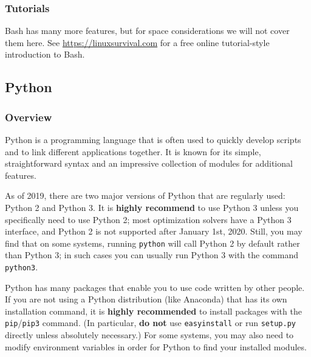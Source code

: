 \documentclass[12pt]{article}
\begin{document}
\subsubsection{Tutorials}
Bash has many more features, but for space considerations we will not cover them here. See \url{https://linuxsurvival.com} for a free online tutorial-style introduction to Bash.

\subsection{Python}
\subsubsection{Overview}
Python is a programming language that is often used to quickly develop scripts and to link different applications together. It is known for its simple, straightforward syntax and an impressive collection of modules for additional features.

As of 2019, there are two major versions of Python that are regularly used: Python 2 and Python 3. It is \textbf{highly recommend} to use Python 3 unless you specifically need to use Python 2; most optimization solvers have a Python 3 interface, and Python 2 is not supported after January 1st, 2020. Still, you may find that on some systems, running \texttt{python} will call Python 2 by default rather than Python 3; in such cases you can usually run Python 3 with the command \texttt{python3}.

Python has many packages that enable you to use code written by other people. If you are not using a Python distribution (like Anaconda) that has its own installation command, it is \textbf{highly recommended} to install packages with the \texttt{pip}/\texttt{pip3} command. (In particular, \textbf{do not} use \texttt{easy\ttul install} or run \texttt{setup.py} directly unless absolutely necessary.) For some systems, you may also need to modify environment variables in order for Python to find your installed modules.
\end{document}
